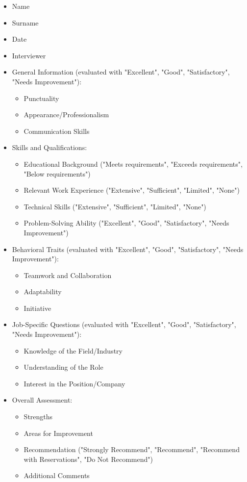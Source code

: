 \begin{itemize}
    \item Name
    \item Surname
    \item Date
    \item Interviewer
    \item General Information (evaluated with "Excellent", "Good", "Satisfactory", "Needs Improvement"):
    \begin{itemize}
        \item Punctuality
        \item Appearance/Professionalism
        \item Communication Skills
    \end{itemize}
    \item Skills and Qualifications:
    \begin{itemize}
        \item Educational Background ("Meets requirements", "Exceeds requirements", "Below requirements")
        \item Relevant Work Experience ("Extensive", "Sufficient", "Limited", "None")
        \item Technical Skills ("Extensive", "Sufficient", "Limited", "None")
        \item Problem-Solving Ability ("Excellent", "Good", "Satisfactory", "Needs Improvement") 
    \end{itemize}
    \item Behavioral Traits (evaluated with "Excellent", "Good", "Satisfactory", "Needs Improvement"):
    \begin{itemize}
        \item Teamwork and Collaboration
        \item Adaptability
        \item Initiative
    \end{itemize}
    \item Job-Specific Questions (evaluated with "Excellent", "Good", "Satisfactory", "Needs Improvement"):
    \begin{itemize}
        \item Knowledge of the Field/Industry
        \item Understanding of the Role
        \item Interest in the Position/Company
    \end{itemize}
    \item Overall Assessment:
    \begin{itemize}
        \item Strengths
        \item Areas for Improvement
        \item Recommendation ("Strongly Recommend", "Recommend", "Recommend with Reservations", "Do Not Recommend")
        \item Additional Comments
    \end{itemize}
\end{itemize}
